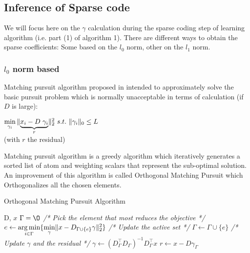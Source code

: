\subsection{Inference of Sparse code}

We will focus here on the $\gamma$ calculation during the sparse coding step of learning algorithm (i.e. part (1) of algorithm 1). There are different ways to obtain the sparse coefficients: Some based on the $l_0$ norm, other on the $l_1$ norm.

\subsubsection{$l_0$ norm based}
Matching pursuit algorithm proposed in \cite{258082} intended to approximately solve the basic pursuit problem which is normally unacceptable in terms of calculation (if $D$ is large):
\begin{center}
 $\min\limits_{\gamma_i} \|\underset{r}{\underbrace{ x_i - D \hspace{3px} \gamma_i }}\|_2^2 \ s.t. \ \|\gamma_i \|_0 \leq L$\\
 (with $r$ the residual)
\end{center}
Matching pursuit algorithm is a greedy algorithm which iteratively generates a sorted list of atom and weighting scalars that represent the sub-optimal solution. An improvement of this algorithm is called Orthogonal Matching Pursuit which Orthogonalizes all the chosen elements.
\begin{algorithm}
 \caption{Orthogonal Matching Pursuit Algorithm}
\begin{algorithmic} 
 \REQUIRE D, $x$
 \STATE $\Gamma = \O$
    \STATE \textit{/* Pick the element that most reduces the objective */}
    \STATE $e \leftarrow \underset{i \in \Gamma}{\operatorname*{arg\,min}} \{ \underset{\gamma}{\min}\|x - D_{\Gamma \cup \{e\}} \gamma\|_2^2\}$ 
    \STATE \textit{/* Update the active set */}
    \STATE $\Gamma \leftarrow \Gamma \cup \{e\}$
    \STATE \textit{ /* Update $\gamma$ and the residual */}
    \STATE $\gamma \leftarrow (D_\Gamma^{\intercal} D_\Gamma)^{-1} D_\Gamma^{\intercal} x$
    \STATE $r \leftarrow x - D\gamma_\Gamma$
 \ENDWHILE
\end{algorithmic}
\end{algorithm}


